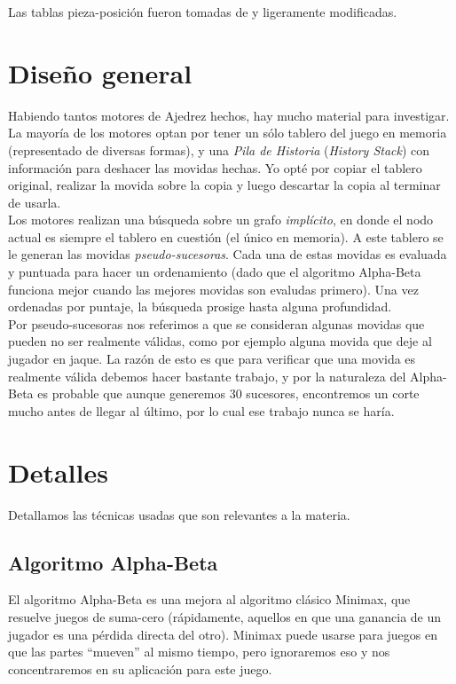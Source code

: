 \documentclass{article}
\begin{document}
Las tablas pieza-posición fueron tomadas de \cite{piece-square-table} y ligeramente modificadas.\\

\section{Diseño general}

Habiendo tantos motores de Ajedrez hechos, hay mucho material para
investigar. La mayoría de los motores optan por tener un sólo tablero
del juego en memoria (representado de diversas formas), y una \emph
{Pila de Historia} (\emph {History Stack}) con información para
deshacer las movidas hechas. Yo opté por copiar el tablero original,
realizar la movida sobre la copia y luego descartar la copia al terminar
de usarla.
\\

Los motores realizan una búsqueda sobre un grafo \emph{implícito},
en donde el nodo actual es siempre el tablero en cuestión (el
único en memoria). A este tablero se le generan las movidas
\emph{pseudo-sucesoras}. Cada una de estas movidas es evaluada y
puntuada para hacer un ordenamiento (dado que el algoritmo Alpha-Beta
funciona mejor cuando las mejores movidas son evaludas primero). Una vez
ordenadas por puntaje, la búsqueda prosige hasta alguna profundidad.
\\

Por pseudo-sucesoras nos referimos a que se consideran algunas movidas
que pueden no ser realmente válidas, como por ejemplo alguna movida que
deje al jugador en jaque. La razón de esto es que para verificar que
una movida es realmente válida debemos hacer bastante trabajo, y por la
naturaleza del Alpha-Beta es probable que aunque generemos 30 sucesores,
encontremos un corte mucho antes de llegar al último, por lo cual ese
trabajo nunca se haría.
\\

\section{Detalles}
Detallamos las técnicas usadas que son relevantes a la materia.

\subsection{Algoritmo Alpha-Beta}

El algoritmo Alpha-Beta es una mejora al algoritmo clásico Minimax,
que resuelve juegos de suma-cero (rápidamente, aquellos en que una
ganancia de un jugador es una pérdida directa del otro). Minimax puede
usarse para juegos en que las partes ``mueven'' al mismo tiempo, pero
ignoraremos eso y nos concentraremos en su aplicación para este juego.
\\
\end{document}
